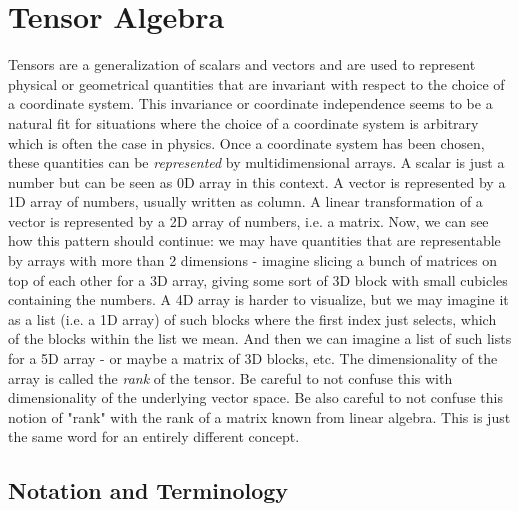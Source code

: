 \section{Tensor Algebra}
Tensors are a generalization of scalars and vectors and are used to represent physical or geometrical quantities that are invariant with respect to the choice of a coordinate system. This invariance or coordinate independence seems to be a natural fit for situations where the choice of a coordinate system is arbitrary which is often the case in physics. Once a coordinate system has been chosen, these quantities can be \emph{represented} by multidimensional arrays. A scalar is just a number but can be seen as 0D array in this context. A vector is represented by a 1D array of numbers, usually written as column. A linear transformation of a vector is represented by a 2D array of numbers, i.e. a matrix. Now, we can see how this pattern should continue: we may have quantities that are representable by arrays with more than 2 dimensions - imagine slicing a bunch of matrices on top of each other for a 3D array, giving some sort of 3D block with small cubicles containing the numbers. A 4D array is harder to visualize, but we may imagine it as a list (i.e. a 1D array) of such blocks where the first index just selects, which of the blocks within the list we mean. And then we can imagine a list of such lists for a 5D array - or maybe a matrix of 3D blocks, etc. The dimensionality of the array is called the \emph{rank} of the tensor. Be careful to not confuse this with dimensionality of the underlying vector space. Be also careful to not confuse this notion of "rank" with the rank of a matrix known from linear algebra. This is just the same word for an entirely different concept.



\subsection{Notation and Terminology}

